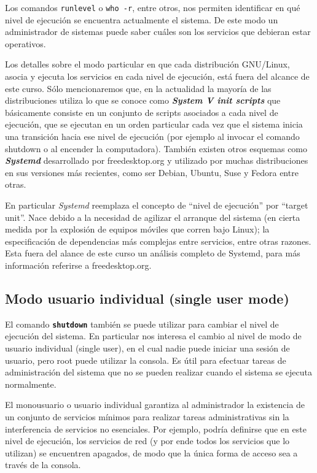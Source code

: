 \documentclass[12pt]{article}
\begin{document}
Los comandos \texttt{runlevel} o \texttt{who -r}, entre otros, nos permiten 
identificar en qué nivel de ejecución se encuentra actualmente el sistema. 
De este modo un administrador de sistemas puede saber cuáles son los servicios
que debieran estar operativos. 

Los detalles sobre el modo particular en que cada distribución GNU/Linux, 
asocia y ejecuta los servicios en cada nivel de ejecución, está fuera 
del alcance de este curso. Sólo mencionaremos que, en la actualidad 
la mayoría de las distribuciones utiliza lo que se conoce como
\textit{\textbf{System V init scripts}} que básicamente consiste en 
un conjunto de scripts asociados a cada nivel de ejecución, que se ejecutan 
en un orden particular cada vez que el sistema inicia una transición 
hacia ese nivel de ejecución (por ejemplo al invocar el comando shutdown 
o al encender la computadora). También existen otros esquemas como 
\textit{\textbf{Systemd}} desarrollado por freedesktop.org y utilizado por
muchas distribuciones en sus versiones más recientes, como ser Debian, Ubuntu, 
Suse y Fedora entre otras. 

En particular \textit{Systemd} reemplaza el concepto de ``nivel de ejecución'' por 
``target unit''. Nace debido a la necesidad de agilizar el arranque del sistema (en 
cierta medida por la explosión de equipos móviles que corren bajo Linux); la 
especificación de dependencias más complejas entre servicios, entre otras razones.  
Esta fuera del alance de este curso un análisis completo de Systemd, para más 
información referirse a freedesktop.org. 

\subsection{ Modo usuario individual (single user mode)}

 El comando \texttt{\textbf{shutdown}} también se puede utilizar para
cambiar el nivel de ejecución del sistema. En particular nos interesa el 
cambio al nivel de modo de usuario individual
(single user), en el cual nadie puede iniciar una sesión de usuario, pero root
puede utilizar la consola. Es útil para efectuar tareas de administración del
sistema que no se pueden realizar cuando el sistema se ejecuta normalmente.

 El monousuario o usuario individual garantiza al administrador la existencia 
de un conjunto de servicios mínimos para realizar tareas administrativas sin 
la interferencia de servicios no esenciales. Por ejemplo, podría definirse que 
en este nivel de ejecución, los servicios de red (y por ende todos los servicios
que lo utilizan) se encuentren apagados, de modo que la única forma de 
acceso sea a través de la consola. 


\end{document}
